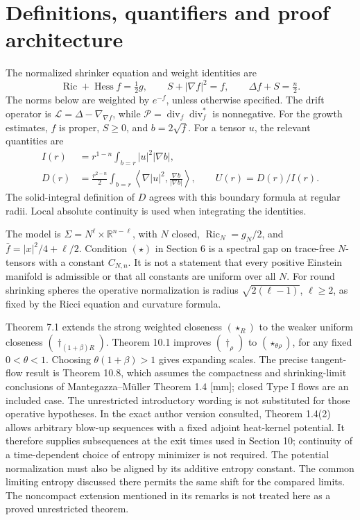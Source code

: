 \documentclass[10pt]{article}
\begin{document}
\section*{Definitions, quantifiers and proof architecture}
The normalized shrinker equation and weight identities are \[\operatorname{Ric}+\operatorname{Hess}f=\tfrac12g,\qquad
 S+|\nabla f|^2=f,\qquad \Delta f+S=\tfrac n2.\] The norms below are weighted by \(e^{-f}\), unless otherwise specified. The drift operator is \(\mathcal L=\Delta-\nabla_{\nabla f}\), while \(\mathcal P=\operatorname{div}_f\operatorname{div}_f^*\) is nonnegative. For the growth estimates, \(f\) is proper, \(S\ge0\), and \(b=2\sqrt f\). For a tensor \(u\), the relevant quantities are \[\begin{aligned}
 I(r)&=r^{1-n}\int_{b=r}|u|^2|\nabla b|,\\
 D(r)&=\frac{r^{2-n}}2\int_{b=r}
       \left\langle\nabla|u|^2,\frac{\nabla b}{|\nabla b|}\right\rangle,
 \qquad U(r)=D(r)/I(r).\end{aligned}\] The solid-integral definition of \(D\) agrees with this boundary formula at regular radii. Local absolute continuity is used when integrating the identities.\par
The model is \(\Sigma=N^\ell\times\mathbb R^{n-\ell}\), with \(N\) closed, \(\operatorname{Ric}_N=g_N/2\), and \(\bar f=|x|^2/4+\ell/2\). Condition \((\star)\) in Section 6 is a spectral gap on trace-free \(N\)-tensors with a constant \(C_{N,n}\). It is not a statement that every positive Einstein manifold is admissible or that all constants are uniform over all \(N\). For round shrinking spheres the operative normalization is radius \(\sqrt{2(\ell-1)}\), \(\ell\ge2\), as fixed by the Ricci equation and curvature formula.\par
Theorem 7.1 extends the strong weighted closeness \((\star_R)\) to the weaker uniform closeness \((\dagger_{(1+\beta)R})\). Theorem 10.1 improves \((\dagger_\rho)\) to \((\star_{\theta\rho})\), for any fixed \(0<\theta<1\). Choosing \(\theta(1+\beta)>1\) gives expanding scales. The precise tangent-flow result is Theorem 10.8, which assumes the compactness and shrinking-limit conclusions of Mantegazza–Müller Theorem 1.4 [mm]; closed Type I flows are an included case. The unrestricted introductory wording is not substituted for those operative hypotheses. In the exact author version consulted, Theorem 1.4(2) allows arbitrary blow-up sequences with a fixed adjoint heat-kernel potential. It therefore supplies subsequences at the exit times used in Section 10; continuity of a time-dependent choice of entropy minimizer is not required. The potential normalization must also be aligned by its additive entropy constant. The common limiting entropy discussed there permits the same shift for the compared limits. The noncompact extension mentioned in its remarks is not treated here as a proved unrestricted theorem.\par
\end{document}
